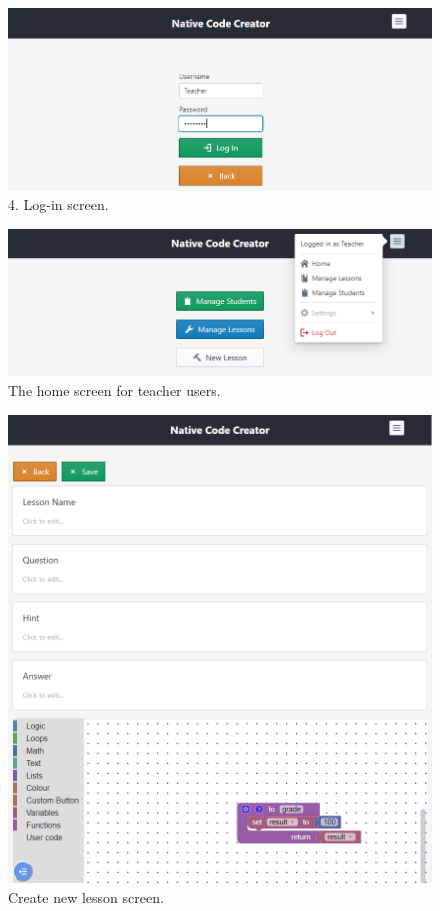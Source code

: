 \documentclass[draftclsnofoot,10pt,onecolumn]{IEEEtran}
\begin{document}
\begin{figure}[h]
    \centering
    \includegraphics[width=\textwidth]{caps4}
    \caption{4. Log-in screen.}
\end{figure}

\begin{figure}[h]
    \centering
    \includegraphics[width=\textwidth]{caps5}
    \caption{The home screen for teacher users.}
\end{figure}

\begin{figure}[h]
    \centering
    \includegraphics[width=\textwidth]{caps6}
    \caption{Create new lesson screen.}
\end{figure}
\end{document}
